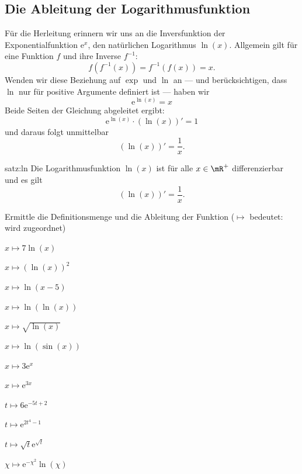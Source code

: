 \documentclass[%
11pt,%
twoside,%
titlepage,%
german,%
headsepline%
]{scrartcl}
\begin{document}
\subsection{Die Ableitung der Logarithmusfunktion}
F\"ur
die Herleitung erinnern wir uns an die Inversfunktion der Exponentialfunktion $\mathrm{e}^x$, den nat\"urlichen Logarithmus $\ln(x)$. Allgemein gilt f\"ur eine Funktion $f$ und ihre Inverse $f^{-1}$:
$$f(f^{-1}(x))=f^{-1}(f(x))=x.$$
Wenden wir diese Beziehung auf $\exp$ und $\ln$ an --- und ber\"ucksichtigen, dass $\ln$ nur f\"ur positive Argumente definiert ist --- haben wir
$$\mathrm{e}^{\ln(x)}=x$$
Beide Seiten der Gleichung abgeleitet ergibt:
$$\mathrm{e}^{\ln(x)}\cdot(\ln(x))'=1$$
und daraus folgt unmittelbar
$$(\ln(x))'=\frac{1}{x}.$$
\begin{csatz}[Ableitung ln]{satz:ln}
Die
Logarithmusfunktion $\ln(x)$ ist f\"ur alle $x\in\mR^+$ differenzierbar und es gilt
$$(\ln(x))'=\frac{1}{x}.$$
\end{csatz}

\begin{ueb}
Ermittle die Definitionsmenge und die Ableitung der Funktion ($\mapsto$ bedeutet: \glqq wird zugeordnet\grqq)

\begin{minipage}{0.4\textwidth}
\begin{enumeratea}
\item $x\mapsto7\ln(x)$
\item $x\mapsto(\ln(x))^2$
\item $x\mapsto\ln(x-5)$
\item $x\mapsto\ln(\ln(x))$
\item $x\mapsto\sqrt{\ln(x)}$
\item $x\mapsto\ln(\sin(x))$
\end{enumeratea}
\end{minipage}
\begin{minipage}{3.9cm}
\begin{enumeratea}
\addtocounter{enumi}{6}
\item $x\mapsto 3\mathrm{e}^{x}$
\item $x\mapsto \mathrm{e}^{3x}$
\item $t\mapsto 6\mathrm{e}^{-5t+2}$
\item $t\mapsto \mathrm{e}^{2t^4-1}$
\item $t\mapsto \sqrt{t}\mathrm{e}^{\sqrt{t}}$
\item $\chi\mapsto \mathrm{e}^{-\chi^2}\ln(\chi)$
\end{enumeratea}
\end{minipage}
\end{ueb}
\end{document}
